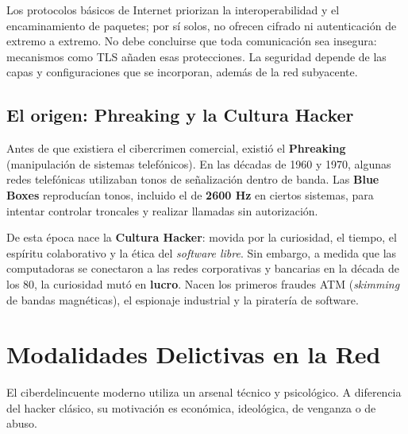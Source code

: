 \documentclass[11pt,a4paper]{article}
\begin{document}
\begin{clave}
Los protocolos básicos de Internet priorizan la interoperabilidad y el encaminamiento de paquetes; por sí solos, no ofrecen cifrado ni autenticación de extremo a extremo. No debe concluirse que toda comunicación sea insegura: mecanismos como TLS añaden esas protecciones. La seguridad depende de las capas y configuraciones que se incorporan, además de la red subyacente.
\end{clave}

\subsection{El origen: Phreaking y la Cultura Hacker}
Antes de que existiera el cibercrimen comercial, existió el \textbf{Phreaking} (manipulación de sistemas telefónicos). En las décadas de 1960 y 1970, algunas redes telefónicas utilizaban tonos de señalización dentro de banda. Las \textbf{Blue Boxes} reproducían tonos, incluido el de \textbf{2600 Hz} en ciertos sistemas, para intentar controlar troncales y realizar llamadas sin autorización.

De esta época nace la \textbf{Cultura Hacker}: movida por la curiosidad, el tiempo, el espíritu colaborativo y la ética del \textit{software libre}. Sin embargo, a medida que las computadoras se conectaron a las redes corporativas y bancarias en la década de los 80, la curiosidad mutó en \textbf{lucro}. Nacen los primeros fraudes ATM (\textit{skimming} de bandas magnéticas), el espionaje industrial y la piratería de software.

\section{Modalidades Delictivas en la Red}
El ciberdelincuente moderno utiliza un arsenal técnico y psicológico. A diferencia del hacker clásico, su motivación es económica, ideológica, de venganza o de abuso.
\end{document}
